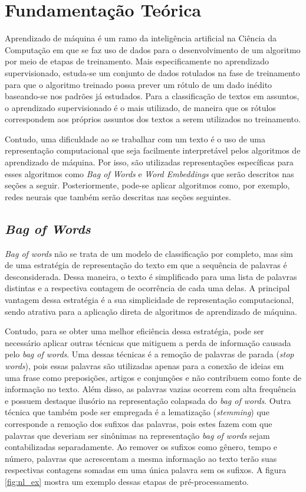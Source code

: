 \chapter{Fundamentação Teórica}
\label{cap:methods}
\noindent

Aprendizado de máquina é um ramo da inteligência artificial na Ciência da Computação em que se faz uso de dados para o desenvolvimento de um algoritmo por meio de etapas de treinamento. Mais especificamente no aprendizado supervisionado, estuda-se um conjunto de dados rotulados na fase de treinamento para que o algoritmo treinado possa prever um rótulo de um dado inédito baseando-se nos padrões já estudados. Para a classificação de textos em assuntos, o aprendizado supervisionado é o mais utilizado, de maneira que os rótulos correspondem aos próprios assuntos dos textos a serem utilizados no treinamento.

Contudo, uma dificuldade ao se trabalhar com um texto é o uso de uma representação computacional que seja facilmente interpretável pelos algoritmos de aprendizado de máquina. Por isso, são utilizadas representações específicas para esses algoritmos como \textit{Bag of Words} e \textit{Word Embeddings} que serão descritos nas seções a seguir. Posteriormente, pode-se aplicar algoritmos como, por exemplo, redes neurais que também serão descritas nas seções seguintes.

\section{\textit{Bag of Words}}

\textit{Bag of words} não se trata de um modelo de classificação por completo, mas sim de uma estratégia de representação do texto em que a sequência de palavras é desconsiderada. Dessa maneira, o texto é simplificado para uma lista de palavras distintas e a respectiva contagem de ocorrência de cada uma delas. A principal vantagem dessa estratégia é a sua simplicidade de representação computacional, sendo atrativa para a aplicação direta de algoritmos de aprendizado de máquina.

Contudo, para se obter uma melhor eficiência dessa estratégia, pode ser necessário aplicar outras técnicas que mitiguem a perda de informação causada pelo \textit{bag of words}. Uma dessas técnicas é a remoção de palavras de parada (\textit{stop words}), pois essas palavras são utilizadas apenas para a conexão de ideias em uma frase como preposições, artigos e conjunções e não contribuem como fonte de informação no texto. Além disso, as palavras vazias ocorrem com alta frequência e possuem destaque ilusório na representação colapsada do \textit{bag of words}. Outra técnica que também pode ser empregada é a lematização (\textit{stemming}) que corresponde a remoção dos sufixos das palavras, pois estes fazem com que palavras que deveriam ser sinônimas na representação \textit{bag of words} sejam contabilizadas separadamente. Ao remover os sufixos como gênero, tempo e número, palavras que acrescentam a mesma informação ao texto terão suas respectivas contagens somadas em uma única palavra sem os sufixos. A figura \ref{fig:nl_ex} mostra um exemplo dessas etapas de pré-processamento.

